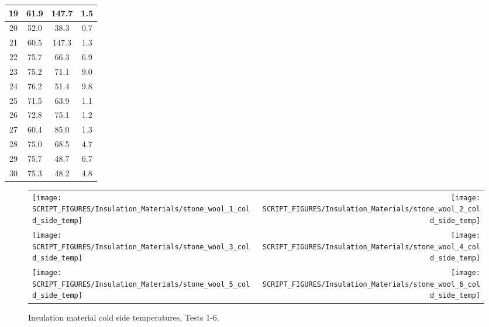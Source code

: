\begin{table}[ht]
\begin{center}
\begin{tabular}{|c|c|c|c|}
19 & 61.9  & 147.7  & 1.5  \\ \hline
20 & 52.0  & 38.3   & 0.7  \\ \hline
21 & 60.5  & 147.3  & 1.3  \\ \hline
22 & 75.7  & 66.3   & 6.9  \\ \hline
23 & 75.2  & 71.1   & 9.0  \\ \hline
24 & 76.2  & 51.4   & 9.8  \\ \hline
25 & 71.5  & 63.9   & 1.1  \\ \hline
26 & 72.8  & 75.1   & 1.2  \\ \hline
27 & 60.4  & 85.0   & 1.3  \\ \hline
28 & 75.0  & 68.5   & 4.7  \\ \hline
29 & 75.7  & 48.7   & 6.7  \\ \hline
30 & 75.3  & 48.2   & 4.8  \\ \hline
\end{tabular}
\end{center}
\label{stone_wool_props}
\end{table}

\newpage

\begin{figure}[p]
	\begin{tabular*}{\textwidth}{l@{\extracolsep{\fill}}r}
		\texttt{[image: SCRIPT\_FIGURES/Insulation\_Materials/stone\_wool\_1\_cold\_side\_temp]} &
		\texttt{[image: SCRIPT\_FIGURES/Insulation\_Materials/stone\_wool\_2\_cold\_side\_temp]} \\
		\texttt{[image: SCRIPT\_FIGURES/Insulation\_Materials/stone\_wool\_3\_cold\_side\_temp]} &
		\texttt{[image: SCRIPT\_FIGURES/Insulation\_Materials/stone\_wool\_4\_cold\_side\_temp]} \\
		\texttt{[image: SCRIPT\_FIGURES/Insulation\_Materials/stone\_wool\_5\_cold\_side\_temp]} &
		\texttt{[image: SCRIPT\_FIGURES/Insulation\_Materials/stone\_wool\_6\_cold\_side\_temp]}
	\end{tabular*}
	\caption[Insulation material cold side temperatures, Tests 1-6]{Insulation material cold side temperatures, Tests 1-6.}
    \label{wool_1}
\end{figure}

